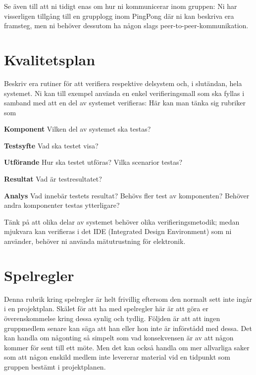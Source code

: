 \documentclass{article}
\begin{document}
Se även till att ni tidigt enas om hur ni kommunicerar inom gruppen: Ni
har visserligen tillgång till en grupplogg inom PingPong där ni kan beskriva era
framsteg, men ni behöver dessutom ha någon slags peer-to-peer-kommunikation.

\section{Kvalitetsplan}
Beskriv era rutiner för att verifiera respektive delsystem och, i slutändan, hela
systemet. Ni kan till exempel använda en enkel verifieringsmall som ska fyllas i
samband med att en del av systemet verifieras: Här kan man tänka sig rubriker
som

\vspace{1em}
\noindent
\textbf{Komponent} Vilken del av systemet ska testas?

\vspace{1em}
\noindent
\textbf{Testsyfte} Vad ska testet visa?

\vspace{1em}
\noindent
\textbf{Utförande} Hur ska testet utföras? Vilka scenarior testas?

\vspace{1em}
\noindent
\textbf{Resultat} Vad är testresultatet?

\vspace{1em}
\noindent
\textbf{Analys} Vad innebär testets resultat? Behövs fler test av komponenten? Behöver andra komponenter testas ytterligare?

\vspace{1em}
Tänk på att olika delar av systemet behöver olika verifieringsmetodik; medan mjukvara kan verifieras i det IDE (Integrated Design Environment) som ni
använder, behöver ni använda mätutrustning för elektronik.

\section{Spelregler}
Denna rubrik kring spelregler är helt frivillig eftersom den normalt sett inte
ingår i en projektplan. Skälet för att ha med spelregler här är att göra er överenskommelse kring dessa synlig och tydlig. Följden är att att ingen gruppmedlem
senare kan säga att han eller hon inte är införstådd med dessa. Det kan handla
om någonting så simpelt som vad konsekvensen är av att någon kommer för sent
till ett möte. Men det kan också handla om mer allvarliga saker som att någon
enskild medlem inte levererar material vid en tidpunkt som gruppen bestämt i
projektplanen.



\end{document}
